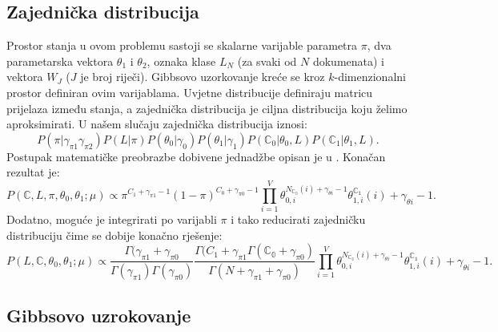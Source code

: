 \subsection{Zajednička distribucija}

Prostor stanja u ovom problemu sastoji se skalarne varijable parametra $\pi$, dva parametarska vektora $\theta_1$ i $\theta_2$, oznaka klase $L_N$ (za svaki od $N$ dokumenata) i vektora $W_J$ ($J$ je broj riječi). Gibbsovo uzorkovanje kreće se kroz $k$-dimenzionalni prostor definiran ovim varijablama. Uvjetne distribucije definiraju matricu prijelaza između stanja, a zajednička distribucija je ciljna distribucija koju želimo aproksimirati. U našem slučaju zajednička distribucija iznosi:
\begin{equation}
P(\pi|\gamma_{\pi 1}\gamma_{\pi 2})P(L|\pi)P(\theta_0 | \gamma_0)P(\theta_1 | \gamma_1)P(\mathbb{C}_0|\theta_0 ,L)P(\mathbb{C}_1 | \theta_1 , L).
\end{equation}
Postupak matematičke preobrazbe dobivene jednadžbe opisan je u \citep{resnik2010gibbs}. Konačan rezultat je:
\begin{equation}
P(\mathbb{C}, L, \pi , \theta_0 , \theta_1 ; \mu) \propto \pi^{C_1+\gamma_{\pi 1}-1}(1-\pi)^{C_0 + \gamma_{\pi 0} - 1} \prod_{i=1}^{V} \theta_{0,i}^{N_{\mathbb{C_0}}(i)+\gamma_{\theta i} - 1}\theta_{1,i}^{\mathbb{C_1}}(i)+\gamma_{\theta i} - 1.
\end{equation}
Dodatno, moguće je integrirati po varijabli $\pi$ i tako reducirati zajedničku distribuciju čime se dobije konačno rješenje:
\begin{equation}
P(L, \mathbb{C}, \theta_0 , \theta_1 ; \mu) \propto \frac{\Gamma(\gamma_{\pi 1}+\gamma_{\pi 0}}{\Gamma(\gamma_{\pi 1})\Gamma(\gamma_{\pi 0})} \frac{\Gamma(C_1+\gamma_{\pi 1}\Gamma(\mathbb{C_0}+\gamma_{\pi 0})}{\Gamma(N+\gamma_{\pi 1} + \gamma_{\pi 0})} \prod_{i=1}^{V} \theta_{0,i}^{N_{\mathbb{C_0}}(i)+\gamma_{\theta i} - 1}\theta_{1,i}^{\mathbb{C_1}}(i)+\gamma_{\theta i} - 1.
\end{equation}

\subsection{Gibbsovo uzrokovanje}

